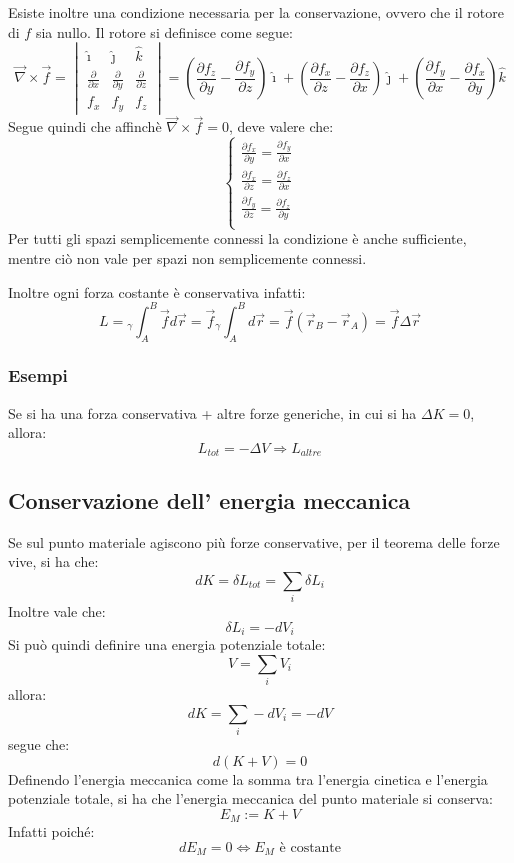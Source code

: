 \documentclass[11pt, a4paper, openright]{book}
\theoremstyle{plain}
\theoremstyle{definition}
\begin{document}
Esiste inoltre una condizione necessaria per la conservazione, ovvero che il rotore di $f$ sia nullo.
Il rotore si definisce come segue:
\[\vec{\nabla} \times \vec{f} = 
\begin{vmatrix}
\displaystyle \hat{\imath} & \hat{\jmath} & \hat{k} \\
\displaystyle \frac{\partial}{\partial x} & \frac{\partial}{\partial y} & \frac{\partial}{\partial z} \\
\displaystyle f_x & f_y & f_z
\end{vmatrix}
= \left( \frac{\partial f_z}{\partial y} - \frac{\partial f_y}{\partial z} \right) \hat{\imath}  + \left( \frac{\partial f_x}{\partial z} - \frac{\partial f_z}{\partial x} \right) \hat{\jmath}  + \left( \frac{\partial f_y}{\partial x} - \frac{\partial f_x}{\partial y} \right) \hat{k}\]
Segue quindi che affinchè $\vec{\nabla} \times \vec{f} = 0$, deve valere che:
\[\begin{cases}
    \displaystyle \frac{\partial f_x}{\partial y} = \frac{\partial f_y}{\partial x} \\[1em]
    \displaystyle \frac{\partial f_x}{\partial z} = \frac{\partial f_z}{\partial x} \\[1em]
    \displaystyle \frac{\partial f_y}{\partial z} = \frac{\partial f_z}{\partial y} \\[1em]
\end{cases}\]
Per tutti gli spazi semplicemente connessi la condizione è anche sufficiente, mentre ciò non vale per spazi non semplicemente connessi.

Inoltre ogni forza costante è conservativa infatti:
\[L = {}_\gamma \int_A^B \vec{f}d\vec{r} = \vec{f} {}_\gamma \int_A^B d\vec{r} = \vec{f}(\vec{r}_B - \vec{r}_A) = \vec{f}\Delta\vec{r}\]



\subsubsection{Esempi}
Se si ha una forza conservativa + altre forze generiche, in cui si ha $\Delta K = 0$, allora:
\[L_{tot} = -\Delta V \Longrightarrow L_{altre}\]

\subsection{Conservazione dell' energia meccanica}
Se sul punto materiale agiscono più forze conservative, per il teorema delle forze vive, si ha che:
\[dK = \delta L_{tot} = \sum_i \delta L_i\]
Inoltre vale che:
\[\delta L_i = -dV_i\]
Si può quindi definire una energia potenziale totale:
\[V = \sum_i V_i\]
allora:
\[dK = \sum_i -dV_i = -dV\]
segue che:
\[d(K + V) = 0\]
Definendo l'energia meccanica come la somma tra l'energia cinetica e l'energia potenziale totale, si ha che l'energia meccanica del punto materiale si conserva:
\[E_M := K + V\]
Infatti poiché:
\[dE_M = 0 \iff E_M \text{ è costante}\]
\end{document}
